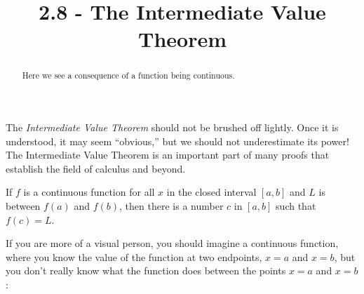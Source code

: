 \documentclass{ximera}
\title{2.8 - The Intermediate Value Theorem}
\begin{document}
\begin{abstract}
  Here we see a consequence of a function being continuous.
\end{abstract}
\maketitle


The \textit{Intermediate Value Theorem} should not be brushed off
lightly. Once it is understood, it may seem ``obvious,'' but
we should not underestimate its power! The Intermediate Value Theorem is an important part of many proofs that establish the field of calculus and beyond.

\begin{theorem}\label{theorem:IVT}
	If $f$ is a continuous function for all $x$ in the closed interval
	$[a,b]$ and $L$ is between $f(a)$ and $f(b)$, then there is a number
	$c$ in $[a, b]$ such that $f(c) = L$.
\end{theorem}


If you are more of a visual person, you should imagine a continuous
function, where you know the value of the function at two endpoints,
$x=a$ and $x=b$, but you don't really know what the function does
between the points $x=a$ and $x=b$:
\end{document}
